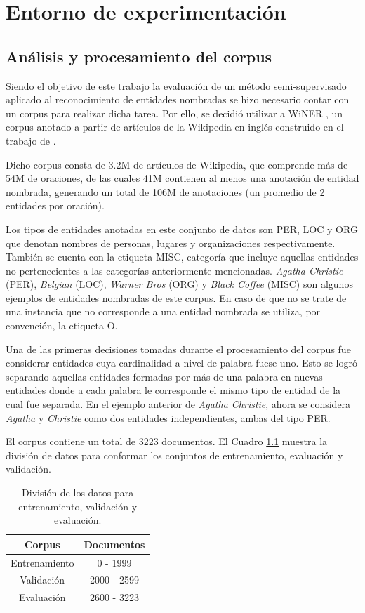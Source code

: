 \chapter{Entorno de experimentación} \label{chapter:chapter3}

\section{Análisis y procesamiento del corpus}

Siendo el objetivo de este trabajo la evaluación de un método semi-supervisado aplicado al reconocimiento de entidades nombradas se hizo necesario contar con un corpus para realizar dicha tarea. Por ello, se decidió utilizar a WiNER , un corpus anotado a partir de artículos de la Wikipedia en inglés construido en el trabajo de \cite{WiNER-Ghaddar-Langlais}.

Dicho corpus consta de 3.2M de artículos de Wikipedia, que comprende más de 54M de oraciones, de las cuales 41M contienen al menos una anotación de entidad nombrada, generando un total de 106M de anotaciones (un promedio de 2 entidades por oración).

Los tipos de entidades anotadas en este conjunto de datos son PER, LOC y ORG que denotan nombres de personas, lugares y organizaciones respectivamente. También se cuenta con la etiqueta MISC, categoría que incluye aquellas entidades no pertenecientes a las categorías anteriormente mencionadas. \textit{Agatha Christie} (PER), \textit{Belgian} (LOC), \textit{Warner Bros} (ORG) y \textit{Black Coffee} (MISC) son algunos ejemplos de entidades nombradas de este corpus. En caso de que no se trate de una instancia que no corresponde a una entidad nombrada se utiliza, por convención, la etiqueta O.

Una de las primeras decisiones tomadas durante el procesamiento del corpus fue considerar entidades cuya cardinalidad a nivel de palabra fuese uno. Esto se logró separando aquellas entidades formadas por más de una palabra en nuevas entidades donde a cada palabra le corresponde el mismo tipo de entidad de la cual fue separada. En el ejemplo anterior de \textit{Agatha Christie}, ahora se considera \textit{Agatha} y \textit{Christie} como dos entidades independientes, ambas del tipo PER.

El corpus contiene un total de 3223 documentos. El Cuadro \ref{tab:division} muestra la división de datos para conformar los conjuntos de entrenamiento, evaluación y validación.

\begin{table}[ht]
    \centering
    \begin{tabular}{|c|c|}
        \hline
        \textbf{Corpus} & \textbf{Documentos} \\
        \hline \hline
        Entrenamiento & 0 - 1999 \\
        Validación & 2000 - 2599 \\
        Evaluación & 2600 - 3223 \\
        \hline
    \end{tabular}
    \caption{División de los datos para entrenamiento, validación y evaluación.}
    \label{tab:division}
\end{table}

